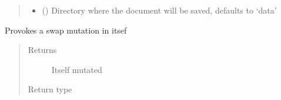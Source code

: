 \documentclass[letterpaper,10pt,english]{sphinxmanual}
\begin{document}
\begin{fulllineitems}
\begin{fulllineitems}
\begin{quote}
\begin{description}
\begin{itemize}
\item {} 
\sphinxAtStartPar
{} (\sphinxstyleliteralemphasis{\sphinxupquote{, }}) \textendash{} Directory where the document will be saved, defaults to ‘data’

\end{itemize}

\end{description}\end{quote}

\end{fulllineitems}


\begin{fulllineitems}
\label{\detokenize{MolOpt.molecular:MolOpt.molecular.molecular.Molecule.swap_mutate}}
\sphinxAtStartPar
Provokes a swap mutation in itsef
\begin{quote}\begin{description}
\item[{Returns}] \leavevmode
\sphinxAtStartPar
Itself mutated

\item[{Return type}] \leavevmode
\sphinxAtStartPar
{\hyperref[\detokenize{MolOpt.molecular:MolOpt.molecular.molecular.Molecule}]{}}

\end{description}\end{quote}

\end{fulllineitems}


\end{fulllineitems}

\end{document}
